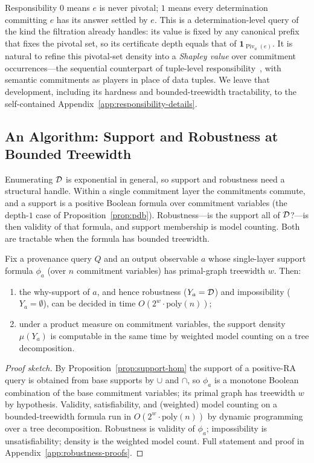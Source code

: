 \noindent
Responsibility $0$ means $e$ is never pivotal; $1$ means every determination
committing $e$ has its answer settled by $e$. This is a determination-level
query of the kind the filtration already handles: its value is fixed by any
canonical prefix that fixes the pivotal set, so its certificate depth equals
that of $\mathbf{1}_{\operatorname{Piv}_a(e)}$. It is natural to refine this
pivotal-set density into a \emph{Shapley value} over commitment
occurrences---the sequential counterpart of tuple-level
responsibility~\cite{meliou2010causality,livshits2021shapley}, with semantic
commitments as players in place of data tuples. We leave that development,
including its hardness and bounded-treewidth tractability, to the
self-contained Appendix~\ref{app:responsibility-details}.

\subsection{An Algorithm: Support and Robustness at Bounded Treewidth}
\label{sec:algorithm}

Enumerating $\mathcal{D}$ is exponential in general, so support and robustness need
a structural handle. Within a single commitment layer the commitments commute,
and a support is a positive Boolean formula over commitment variables (the
depth-$1$ case of Proposition~\ref{prop:pdb}). Robustness---is the support
all of $\mathcal{D}$?---is then validity of that formula, and support membership is
model counting. Both are tractable when the formula has bounded treewidth.

\begin{theorem}
  \label{thm:treewidth}
  Fix a provenance query $Q$ and an output observable $a$ whose single-layer
  support formula $\phi_a$ (over $n$ commitment variables) has primal-graph
  treewidth $w$. Then:
  \begin{enumerate}[nosep,label=(\alph*)]
    \item the why-support of $a$, and hence robustness
          ($Y_a = \mathcal{D}$) and impossibility ($Y_a = \emptyset$), can be
          decided in time $O(2^w \cdot \mathrm{poly}(n))$;
    \item under a product measure on commitment variables, the support
          density $\mu(Y_a)$ is computable in the same time by weighted model
          counting on a tree decomposition.
  \end{enumerate}
\end{theorem}
\begin{proof}[Proof sketch]
  By Proposition~\ref{prop:support-hom} the support of a positive-RA query is
  obtained from base supports by $\cup$ and $\cap$, so $\phi_a$ is a monotone
  Boolean combination of the base commitment variables; its primal graph has
  treewidth $w$ by hypothesis. Validity, satisfiability, and (weighted) model
  counting on a bounded-treewidth formula run in $O(2^w \cdot \mathrm{poly}(n))$
  by dynamic programming over a tree decomposition. Robustness is validity of
  $\phi_a$; impossibility is unsatisfiability; density is the weighted model
  count. Full statement and proof in Appendix~\ref{app:robustness-proofs}.
\end{proof}

